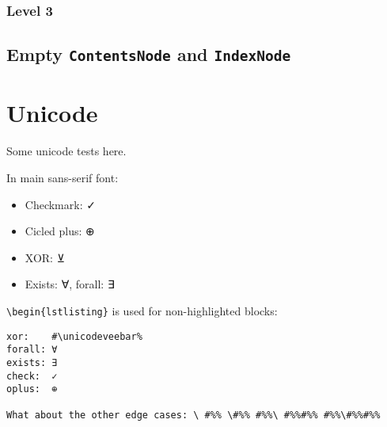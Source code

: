 \label{16667177169392038189}{}


\subsection{Level 3}



\label{1607357897553791978}{}


\section{Empty \texttt{ContentsNode} and \texttt{IndexNode}}



\label{8268966452746558956}{}




\chapter{Unicode}



\label{14828929048168676331}{}


Some unicode tests here.



In main sans-serif font:



\begin{itemize}
\item Checkmark: {\textquotedbl}✓{\textquotedbl}


\item Cicled plus: {\textquotedbl}⊕{\textquotedbl}


\item XOR: {\textquotedbl}⊻{\textquotedbl}


\item Exists: {\textquotedbl}∀{\textquotedbl}, forall: {\textquotedbl}∃{\textquotedbl}

\end{itemize}


\texttt{{\textbackslash}begin\{lstlisting\}} is used for non-highlighted blocks:




\begin{lstlisting}[escapeinside=\#\%,]
xor:    #\unicodeveebar%
forall: ∀
exists: ∃
check:  ✓
oplus:  ⊕

What about the other edge cases: \ #%% \#%% #%%\ #%%#%% #%%\#%%#%%
\end{lstlisting}



